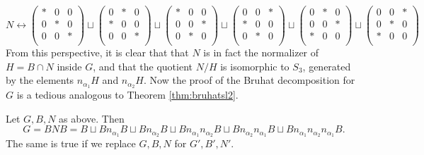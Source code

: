 \begin{equation*}
    N\longleftrightarrow\begin{pmatrix}
        * & 0 & 0\\
        0 & * & 0\\
        0 & 0 & *\\
    \end{pmatrix}\sqcup\begin{pmatrix}
        0 & * & 0\\
        * & 0 & 0\\
        0 & 0 & *\\
    \end{pmatrix}\sqcup\begin{pmatrix}
        * & 0 & 0\\
        0 & 0 & *\\
        0 & * & 0\\
    \end{pmatrix}\sqcup\begin{pmatrix}
        0 & 0 & *\\
        * & 0 & 0\\
        0 & * & 0\\
    \end{pmatrix}\sqcup\begin{pmatrix}
        0 & * & 0\\
        0 & 0 & *\\
        * & 0 & 0\\
    \end{pmatrix}\sqcup\begin{pmatrix}
        0 & 0 & *\\
        0 & * & 0\\
        * & 0 & 0\\
    \end{pmatrix}
\end{equation*}
From this perspective, it is clear that that $N$ is in fact the normalizer of $H=B\cap N$ inside $G$, and that the quotient $N/H$ is isomorphic to $S_3$, generated by the elements $n_{\alpha_1}H$ and $n_{\alpha_2}H$. Now the proof of the Bruhat decomposition for $G$ is a tedious analogous to Theorem \ref{thm:bruhatsl2}.

\begin{theorem} 
    Let $G,B,N$ as above. Then 
    $$G=BNB=B\sqcup Bn_{\alpha_1}B\sqcup Bn_{\alpha_2}B\sqcup Bn_{\alpha_1}n_{\alpha_2}B\sqcup Bn_{\alpha_2}n_{\alpha_1}B\sqcup Bn_{\alpha_1}n_{\alpha_2}n_{\alpha_1}B.$$  
    The same is true if we replace $G,B,N$ for $G',B',N'$.
\end{theorem}







